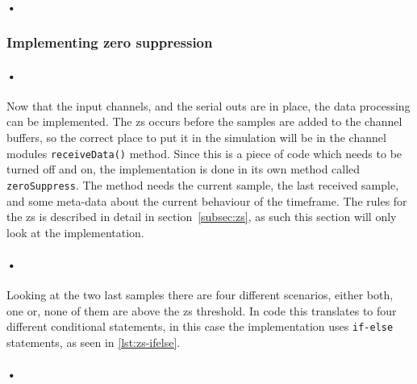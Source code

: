 \documentclass[a4paper, 12pt]{report}
\newcommand{\codeword}[1]{\texttt{#1}}
\begin{document}
\paragraph{•}
\begin{minipage}{\linewidth}

\end{minipage}

\subsubsection{Implementing zero suppression}

\paragraph{•} 
Now that the input channels, and the serial outs are in place, the data processing can be implemented.
The \gls{zs} occurs before the samples are added to the channel buffers, so the correct place to put it in the simulation will be in the channel modules \codeword{receiveData()} method.
Since this is a piece of code which needs to be turned off and on, the implementation is done in its own method called \codeword{zeroSuppress}.
The method needs the current sample, the last received sample, and some meta-data about the current behaviour of the timeframe.
The rules for the \gls{zs} is described in detail in section~\ref{subsec:zs}, as such this section will only look at the implementation.

\paragraph{•}
Looking at the two last samples there are four different scenarios, either both, one or, none of them are above the \gls{zs} threshold.
In code this translates to four different conditional statements, in this case the implementation uses \codeword{if-else} statements, as seen in \ref{lst:zs-ifelse}.

\paragraph{•}
\begin{minipage}{\linewidth}

\end{minipage}
\end{document}
